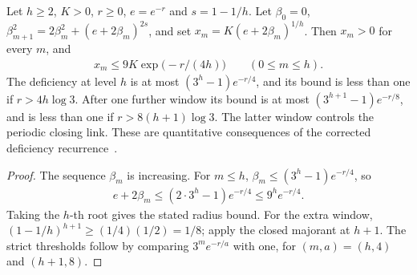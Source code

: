 \begin{lemma}
    \label{thm:hastings05_uniform_hierarchy_radii}
    \leanok
    Let $h\ge2$, $K>0$, $r\ge0$, $e=e^{-r}$ and $s=1-1/h$. Let
    $\beta_0=0$, $\beta_{m+1}^2=2\beta_m^2+(e+2\beta_m)^{2s}$, and set
    $x_m=K(e+2\beta_m)^{1/h}$. Then $x_m>0$ for every $m$, and
    \begin{align*}
        x_m\le9K\exp\bigl(-r/(4h)\bigr)\qquad(0\le m\le h).
    \end{align*}
    The deficiency at level $h$ is at most $(3^h-1)e^{-r/4}$,
    and its bound is less than one if $r>4h\log3$.
    After one further window its bound is at most
    $(3^{h+1}-1)e^{-r/8}$, and is less than one if
    $r>8(h+1)\log3$. The latter window controls the periodic closing link.
    These are quantitative consequences of the corrected deficiency
    recurrence~\cite{gap:hastings05_hierarchical_projection}.
\end{lemma}
\begin{proof}\leanok
    The sequence $\beta_m$ is increasing. For $m\le h$,
    $\beta_m\le(3^h-1)e^{-r/4}$, so
    \begin{align*}
        e+2\beta_m\le(2\cdot3^h-1)e^{-r/4}
        \le9^h e^{-r/4}.
    \end{align*}
    Taking the $h$-th root gives the stated radius bound. For the extra
    window, $(1-1/h)^{h+1}\ge(1/4)(1/2)=1/8$; apply the closed majorant
    at $h+1$. The strict thresholds follow by comparing $3^m e^{-r/a}$
    with one, for $(m,a)=(h,4)$ and $(h+1,8)$.
\end{proof}

